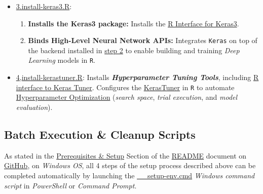 \documentclass[
]{report}
\providecommand{\tightlist}{%
  \setlength{\itemsep}{0pt}\setlength{\parskip}{0pt}}
\begin{document}
\begin{itemize}
\tightlist
\item
  \href{https://github.com/AzKurban-edX-DS/edx.capstone.choose-your-own/blob/main/r/support-scripts/setup-env/3.install-keras3.R}{3.install-keras3.R}:

  \begin{enumerate}
  \def\labelenumi{\arabic{enumi}.}
  \tightlist
  \item
    \textbf{Installs the Keras3 package:} Installs the \href{https://rstudio.r-universe.dev/keras3}{R Interface for Keras3}.
  \item
    \textbf{Binds High-Level Neural Network APIs:} Integrates \texttt{Keras} on top of the backend installed in \hyperref[env_setup.step2]{step 2} to enable building and training \emph{Deep Learning} models in \texttt{R}.
  \end{enumerate}
\item
  \href{https://github.com/AzKurban-edX-DS/edx.capstone.choose-your-own/blob/main/r/support-scripts/setup-env/4.install-kerastuner.R}{4,install-kerastuner.R}: Installs \textbf{\emph{Hyperparameter Tuning Tools}}, including \href{https://eagerai.github.io/kerastuneR/}{R interface to Keras Tuner}. Configures the \href{https://keras.io/keras_tuner/}{KerasTuner} in \texttt{R} to automate \href{https://www.geeksforgeeks.org/deep-learning/keras-tuner-for-hyperparameter-optimization/}{Hyperparameter Optimization} (\emph{search space}, \emph{trial execution}, and \emph{model evaluation}).
\end{itemize}

\subsection{Batch Execution \& Cleanup Scripts}\label{batch-execution-cleanup-scripts}

As stated in the \href{https://github.com/AzKurban-edX-DS/edx.capstone.choose-your-own/blob/main/README.md\#prerequisites--setup}{Prerequisites \& Setup} Section of the \href{https://github.com/AzKurban-edX-DS/edx.capstone.choose-your-own/blob/main/README.md}{README} document on \href{https://github.com/AzKurban-edX-DS/edx.capstone.choose-your-own}{GitHub}, on \emph{Windows OS}, all 4 steps of the setup process described above can be completed automatically by launching the \href{https://github.com/AzKurban-edX-DS/edx.capstone.choose-your-own/blob/main/r/support-scripts/setup-env/__setup-env.cmd}{\_\_setup-env.cmd} \emph{Windows command script} in \emph{PowerShell} or \emph{Command Prompt}.
\end{document}
